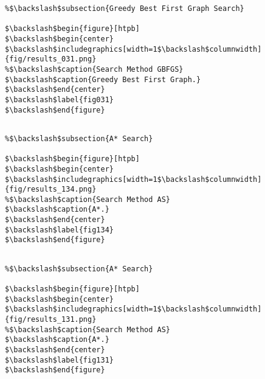 \documentclass{article}
\begin{document}
\begin{verbatim}
%$\backslash$subsection{Greedy Best First Graph Search}

$\backslash$begin{figure}[htpb]
$\backslash$begin{center}
$\backslash$includegraphics[width=1$\backslash$columnwidth]{fig/results_031.png}
%$\backslash$caption{Search Method GBFGS}
$\backslash$caption{Greedy Best First Graph.}
$\backslash$end{center}
$\backslash$label{fig031}
$\backslash$end{figure}
        
\end{verbatim}






















\begin{verbatim}
%$\backslash$subsection{A* Search}

$\backslash$begin{figure}[htpb]
$\backslash$begin{center}
$\backslash$includegraphics[width=1$\backslash$columnwidth]{fig/results_134.png}
%$\backslash$caption{Search Method AS}
$\backslash$caption{A*.}
$\backslash$end{center}
$\backslash$label{fig134}
$\backslash$end{figure}
        
\end{verbatim}






















\begin{verbatim}
%$\backslash$subsection{A* Search}

$\backslash$begin{figure}[htpb]
$\backslash$begin{center}
$\backslash$includegraphics[width=1$\backslash$columnwidth]{fig/results_131.png}
%$\backslash$caption{Search Method AS}
$\backslash$caption{A*.}
$\backslash$end{center}
$\backslash$label{fig131}
$\backslash$end{figure}
        
\end{verbatim}
\end{document}
